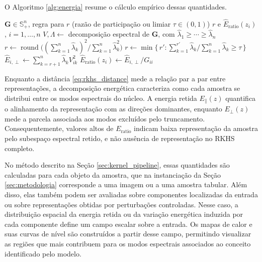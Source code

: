 O Algoritmo \ref{alg:energia} resume o cálculo empírico dessas quantidades.

\begin{algorithm}[htbp]
\caption{Subespaço retido e razão de energia ortogonal}
\label{alg:energia}
\begin{algorithmic}[1]
\Require $\mathbf{G} \in \mathbb{S}_+^n$, regra para $r$ (razão de participação ou limiar $\tau \in (0,1)$)
\Ensure $r$ e $\widehat{E}_{\mathrm{ratio}}(z_i)$, $i = 1,\dots,n$
\State $V, \Lambda \gets$ decomposição espectral de $\mathbf{G}$, com $\widehat{\lambda}_1 \geq \cdots \geq \widehat{\lambda}_n$
    \State $r \gets \operatorname{round}\bigl( (\sum_{k=1}^{n} \widehat{\lambda}_k)^2 \big/ \sum_{k=1}^{n} \widehat{\lambda}_k^2 \bigr)$ 
\Else
    \State $r \gets \min\{\, r' : \sum_{k=1}^{r'} \widehat{\lambda}_k \big/ \sum_{k=1}^{n} \widehat{\lambda}_k \geq \tau \,\}$ 
\EndIf
{}
    \State $\widehat{E}_{i,\perp} \gets \sum_{k=r+1}^{n} \widehat{\lambda}_k V_{ik}^2$
    \State $\widehat{E}_{\mathrm{ratio}}(z_i) \gets \widehat{E}_{i,\perp} / G_{ii}$
\EndFor
\end{algorithmic}
\end{algorithm}

\begin{remark}\label{rem:diagnostic}
Enquanto a distância \eqref{eq:rkhs_distance} mede a relação par a par entre representações, a decomposição energética caracteriza como cada amostra se distribui entre os modos espectrais do núcleo. A energia retida $E_\parallel(z)$ quantifica o alinhamento da representação com as direções dominantes, enquanto $E_\perp(z)$ mede a parcela associada aos modos excluídos pelo truncamento. Consequentemente, valores altos de $E_{\mathrm{ratio}}$ indicam baixa representação da amostra pelo subespaço espectral retido, e não ausência de representação no RKHS completo.

No método descrito na Seção \ref{sec:kernel_pipeline}, essas quantidades são calculadas para cada objeto da amostra, que na instanciação da Seção \ref{sec:metodologia} corresponde a uma imagem ou a uma amostra tabular. Além disso, elas também podem ser avaliadas sobre componentes localizadas da entrada ou sobre representações obtidas por perturbações controladas. Nesse caso, a distribuição espacial da energia retida ou da variação energética induzida por cada componente define um campo escalar sobre a entrada. Os mapas de calor e suas curvas de nível são construídos a partir desse campo, permitindo visualizar as regiões que mais contribuem para os modos espectrais associados ao conceito identificado pelo modelo.
\end{remark}